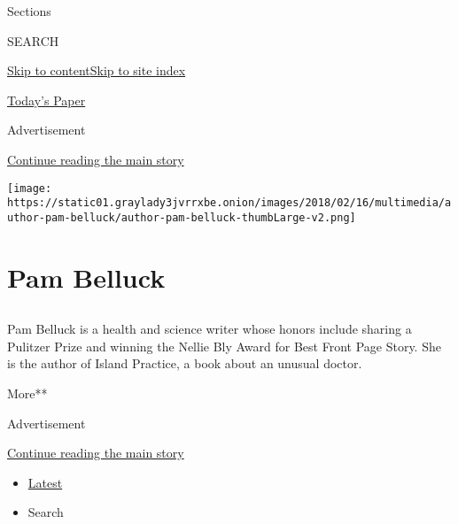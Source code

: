 Sections

SEARCH

\protect\hyperlink{site-content}{Skip to
content}\protect\hyperlink{site-index}{Skip to site index}

\href{https://myaccount.nytimes3xbfgragh.onion/auth/login?response_type=cookie\&client_id=vi}{}

\href{https://www.nytimes3xbfgragh.onion/section/todayspaper}{Today's
Paper}

Advertisement

\protect\hyperlink{after-top}{Continue reading the main story}

\texttt{[image: https://static01.graylady3jvrrxbe.onion/images/2018/02/16/multimedia/author-pam-belluck/author-pam-belluck-thumbLarge-v2.png]}

\hypertarget{pam-belluck}{%
\section{Pam Belluck}\label{pam-belluck}}

\subsection{}

Pam Belluck is a health and science writer whose honors include sharing
a Pulitzer Prize and winning the Nellie Bly Award for Best Front Page
Story. She is the author of Island Practice, a book about an unusual
doctor.

More**

Advertisement

\protect\hyperlink{after-mid1}{Continue reading the main story}

\begin{itemize}
\tightlist
\item
  \protect\hyperlink{stream-panel}{Latest}
\item
  Search
\end{itemize}

